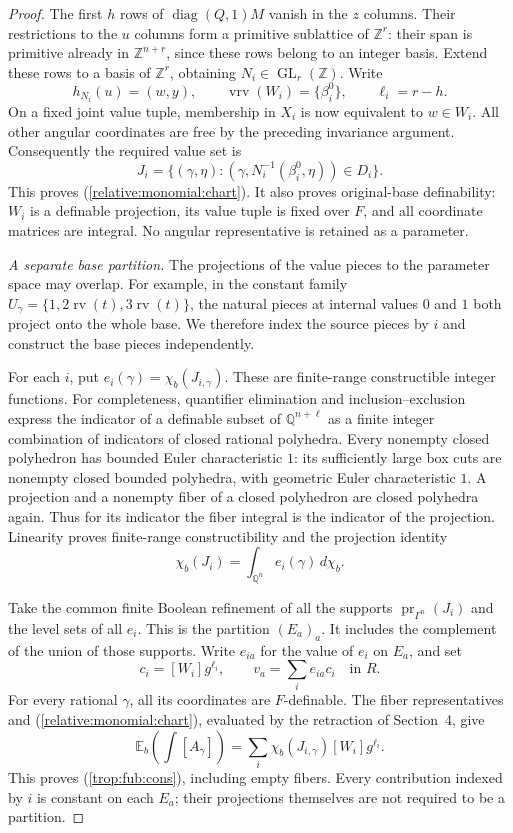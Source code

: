\documentclass[12pt]{amsart}
\theoremstyle{remark}
\theoremstyle{definition}
\newcommand{\Q}{\mathds{Q}}
\newcommand{\rv}{\operatorname{rv}}
\newcommand{\Z}{\mathds{Z}}
\newcommand{\vrv}{\operatorname{vrv}}
\newcommand{\GL}{\operatorname{GL}}
\numberwithin{equation}{section}
\newcommand{\E}{\mathbb E_b}
\theoremstyle{plain}
\begin{document}
{\begin{proof}
The first $h$ rows of $\operatorname{diag}(Q,1)M$ vanish in
the $z$ columns. Their restrictions to the $u$ columns form
a primitive sublattice of $\Z^r$: their span is primitive
already in $\Z^{n+r}$, since these rows belong to an integer
basis. Extend these rows to a basis of $\Z^r$, obtaining
$N_i\in\GL_r(\Z)$. Write
\[
 h_{N_i}(u)=(w,y),\qquad
 \vrv(W_i)=\{\beta_i^0\},\qquad \ell_i=r-h.
\]
On a fixed joint value tuple, membership in $X_i$ is now
equivalent to $w\in W_i$. All other angular coordinates
are free by the preceding invariance argument.
Consequently the required value set is
\[
 J_i=\{(\gamma,\eta):
       (\gamma,N_i^{-1}(\beta_i^0,\eta))\in D_i\}.
\]
This proves (\ref{relative:monomial:chart}).
It also proves original-base definability: $W_i$ is a
definable projection, its value tuple is fixed over $F$,
and all coordinate matrices are integral. No angular
representative is retained as a parameter.

\emph{A separate base partition.}
The projections of the value pieces to the parameter space
may overlap. For example, in the constant family
$U_\gamma=\{1,2\rv(t),3\rv(t)\}$, the natural pieces at
internal values $0$ and $1$ both project onto the whole base.
We therefore index the source pieces by $i$ and construct
the base pieces independently.

For each $i$, put $e_i(\gamma)=\chi_b(J_{i,\gamma})$.
These are finite-range constructible integer functions.
For completeness, quantifier elimination and
inclusion--exclusion express the indicator of a definable
subset of $\Q^{n+\ell}$ as a finite integer combination of
indicators of closed rational polyhedra.
Every nonempty closed polyhedron has bounded Euler
characteristic $1$: its sufficiently large box cuts are
nonempty closed bounded polyhedra, with geometric Euler
characteristic $1$. A projection and a nonempty fiber of
a closed polyhedron are closed polyhedra again.
Thus for its indicator the fiber integral is the indicator
of the projection. Linearity proves finite-range
constructibility and the projection identity
\begin{equation}\label{gamma:projection:formula}
 \chi_b(J_i)=\int_{\Q^n} e_i(\gamma)\,d\chi_b.
\end{equation}

Take the common finite Boolean refinement of all the supports
$\operatorname{pr}_{\Gamma^n}(J_i)$ and the level sets of
all $e_i$. This is the partition $(E_a)_a$.
It includes the complement of the union of those supports.
Write $e_{ia}$ for the value of $e_i$ on $E_a$, and set
\[
 c_i=[W_i]g^{\ell_i},\qquad v_a=\sum_i e_{ia}c_i\quad\text{in }R.
\]
For every rational $\gamma$, all its coordinates are
$F$-definable. The fiber representatives and
(\ref{relative:monomial:chart}), evaluated by the retraction
of Section~4, give
\[
 \E\!\left(\int[A_\gamma]\right)
       =\sum_i\chi_b(J_{i,\gamma})[W_i]g^{\ell_i}.
\]
This proves (\ref{trop:fub:cons}), including empty fibers.
Every contribution indexed by $i$ is constant on each $E_a$;
their projections themselves are not required to be a partition.


\end{proof}}
\end{document}
